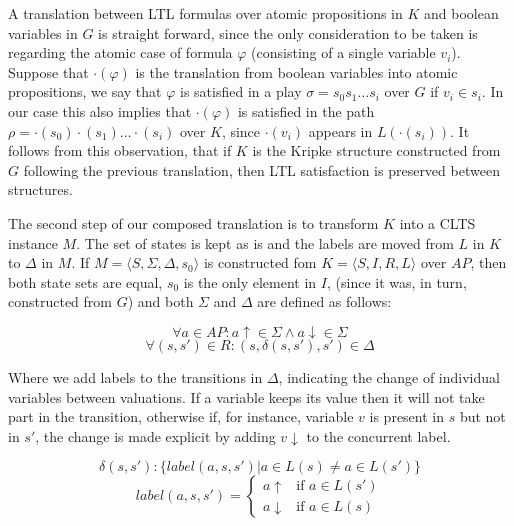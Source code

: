 A translation between LTL formulas over atomic propositions in $K$ and boolean variables in $G$ is straight forward, since the only consideration to be taken is regarding the atomic case of formula $\varphi$ (consisting of a single variable $v_i$). Suppose that $\cdot(\varphi)$ is the translation from boolean variables into atomic propositions, we say that $\varphi$ is satisfied in a play $\sigma=s_0s_1\ldots s_i$ over $G$ if $v_i \in s_i$. In our case this also implies that $\cdot(\varphi)$ is satisfied in the path $\rho=\cdot(s_0)\cdot(s_1)\ldots \cdot(s_i)$ over $K$, since $\cdot(v_i)$ appears in $L(\cdot(s_i))$. It follows from this observation, that if $K$ is the Kripke structure constructed from $G$ following the previous translation, then LTL satisfaction is preserved between structures.

The second step of our composed translation is to transform $K$ into a CLTS instance $M$.
The set of states is kept as is and the labels are moved from $L$ in $K$ to $\Delta$ in $M$. If $M=\langle S, \Sigma, \Delta, s_0 \rangle$ is constructed fom $K =\langle S,I,R,L \rangle$ over $AP$, then both state sets are equal, $s_0$ is the only element in $I$, (since it was, in turn, constructed from $G$) and both $\Sigma$ and $\Delta$ are defined as follows:

\[\forall a \in AP: a\uparrow \in \Sigma \wedge a\downarrow \in \Sigma \]
\[\forall (s, s') \in R: (s, \delta(s,s'), s') \in \Delta \]

Where we add labels to the transitions in $\Delta$, indicating the change of individual variables between valuations. If a variable keeps its value then it will not take part in the transition, otherwise if, for instance, variable $v$ is present in $s$ but not in $s'$, the change is made explicit by adding $v\downarrow$ to the concurrent label.

\[\delta(s,s'): \lbrace label(a,s,s') | a \in L(s) \neq a \in L(s') \rbrace\]
\[
label (a,s,s') = \begin{cases}
a\uparrow & \text{if } a \in L(s') \\
a\downarrow & \text{if } a \in L(s)
\end{cases}
\]

